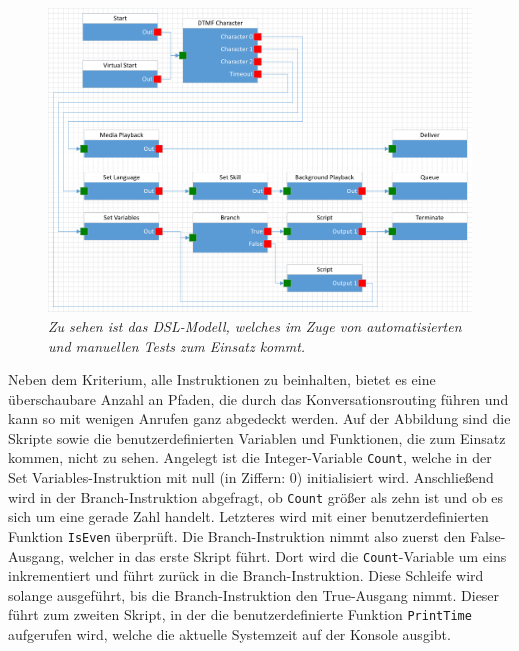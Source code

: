 \begin{figure} %
	\centering
		\includegraphics[width=\textwidth]{img/TestRouting.png}
	\caption[DSL-Modell für Tests]{\textit{Zu sehen ist das DSL-Modell, welches im Zuge von automatisierten und manuellen  Tests zum Einsatz kommt.}}
	\label{fig:TestRouting}
\end{figure}
\noindent Neben dem Kriterium, alle Instruktionen zu beinhalten, bietet es eine überschaubare Anzahl an Pfaden, die durch das Konversationsrouting  führen und kann so mit wenigen Anrufen ganz abgedeckt werden. Auf der Abbildung sind die Skripte sowie die benutzerdefinierten Variablen und Funktionen, die zum Einsatz kommen, nicht zu sehen. Angelegt ist die Integer-Variable \texttt{Count}, welche in der Set Variables-Instruktion mit null (in Ziffern: 0) initialisiert wird. Anschließend wird in der Branch-Instruktion abgefragt, ob \texttt{Count} größer als zehn ist und ob es sich um eine gerade Zahl handelt. Letzteres wird mit einer benutzerdefinierten Funktion \texttt{IsEven} überprüft. Die Branch-Instruktion nimmt also zuerst den False-Ausgang, welcher in das erste Skript führt. Dort wird die \texttt{Count}-Variable um eins inkrementiert und führt zurück in die Branch-Instruktion. Diese Schleife wird solange ausgeführt, bis die Branch-Instruktion den True-Ausgang nimmt. Dieser führt zum zweiten Skript, in der die benutzerdefinierte Funktion \texttt{PrintTime} aufgerufen wird, welche die aktuelle Systemzeit auf der Konsole ausgibt.

